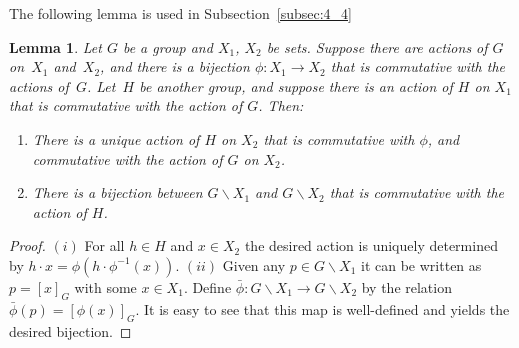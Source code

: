 \documentclass[11pt]{article}
\newtheorem{lemma}{Lemma}
\begin{document}
The following lemma is used in Subsection~\ref{subsec:4_4}
\begin{lemma}\label{lem:apr8_1}
Let $G$ be a group and $X_1$, $X_2$ be sets.
Suppose there are actions of $G$ on~$X_1$ and~$X_2$, and there is a bijection $\phi : X_1 \rightarrow X_2$ that is
commutative with the actions of~$G$.
Let~$H$ be another group, and suppose there is an action of $H$ on $X_1$ that is commutative with the action of $G$.
Then:
\begin{enumerate}\itemsep=0pt
\item There is a unique action of $H$ on $X_2$ that is commutative with $\phi$, and commutative with
the action of $G$ on $X_2$.
\item There is a bijection between $G \backslash X_1$ and  $G \backslash X_2$ that is commutative with the action of $H$.
\end{enumerate}
\end{lemma}
\begin{proof}
$(i)$ For all $h \in H$ and $x \in X_2$
the desired action is uniquely determined by $h \cdot x = \phi (h \cdot \phi^{-1} (x))$.
$(ii)$
Given any $p \in G \backslash X_1$ it can be written as $p = [x]_G$ with some $x \in X_1$.
Def\/ine $\bar{\phi}: G \backslash X_1 \rightarrow G \backslash X_2$ by the relation $\bar{\phi} (p) = [\phi (x)]_G$.
It is easy to see that this map is well-def\/ined and yields the desired bijection.
\end{proof}
\end{document}
